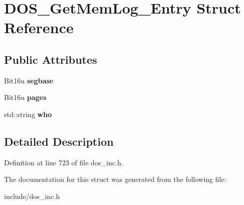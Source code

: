 \hypertarget{structDOS__GetMemLog__Entry}{\section{D\-O\-S\-\_\-\-Get\-Mem\-Log\-\_\-\-Entry Struct Reference}
\label{structDOS__GetMemLog__Entry}
}
\subsection*{Public Attributes}
\begin{DoxyCompactItemize}
\item 
\hypertarget{structDOS__GetMemLog__Entry_ae0b40132debcc642571b174128f14a0c}{Bit16u {\bfseries segbase}}\label{structDOS__GetMemLog__Entry_ae0b40132debcc642571b174128f14a0c}

\item 
\hypertarget{structDOS__GetMemLog__Entry_a1687425bea21c2dba1d7dcf5137ac5e3}{Bit16u {\bfseries pages}}\label{structDOS__GetMemLog__Entry_a1687425bea21c2dba1d7dcf5137ac5e3}

\item 
\hypertarget{structDOS__GetMemLog__Entry_ad8a1936e9a6a49aa924a0fc9e585d18f}{std\-::string {\bfseries who}}\label{structDOS__GetMemLog__Entry_ad8a1936e9a6a49aa924a0fc9e585d18f}

\end{DoxyCompactItemize}


\subsection{Detailed Description}


Definition at line 723 of file dos\-\_\-inc.\-h.



The documentation for this struct was generated from the following file\-:\begin{DoxyCompactItemize}
\item 
include/dos\-\_\-inc.\-h\end{DoxyCompactItemize}
